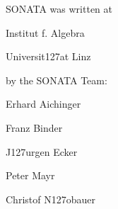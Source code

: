 %
%

SONATA was written at
\begingroup
\smallskip \parindent3pc \parskip 0pt
\item{} Institut f. Algebra
\item{} Universit\accent127at Linz
\endgroup

by the SONATA Team:

\begingroup
\smallskip \parindent3pc \parskip 0pt
\item{} Erhard Aichinger
\item{} Franz Binder
\item{} J\accent127urgen Ecker
\item{} Peter Mayr
\item{} Christof N\accent127obauer
\endgroup



